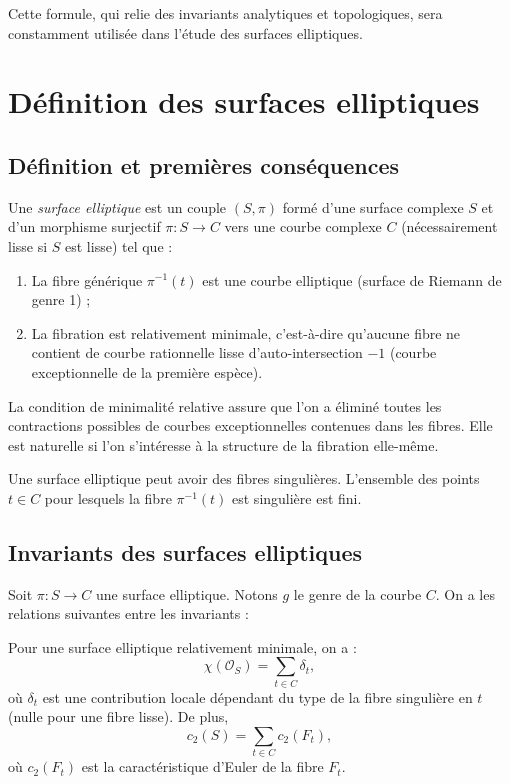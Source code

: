 Cette formule, qui relie des invariants analytiques et topologiques, sera constamment utilisée dans l'étude des surfaces elliptiques.

\section{Définition des surfaces elliptiques}

\subsection{Définition et premières conséquences}

\begin{definition}
Une \emph{surface elliptique} est un couple $(S, \pi)$ formé d'une surface complexe $S$ et d'un morphisme surjectif $\pi: S \to C$ vers une courbe complexe $C$ (nécessairement lisse si $S$ est lisse) tel que :
\begin{enumerate}
\item La fibre générique $\pi^{-1}(t)$ est une courbe elliptique (surface de Riemann de genre 1) ;
\item La fibration est relativement minimale, c'est-à-dire qu'aucune fibre ne contient de courbe rationnelle lisse d'auto-intersection $-1$ (courbe exceptionnelle de la première espèce).
\end{enumerate}
\end{definition}

La condition de minimalité relative assure que l'on a éliminé toutes les contractions possibles de courbes exceptionnelles contenues dans les fibres. Elle est naturelle si l'on s'intéresse à la structure de la fibration elle-même.

\begin{remarque}
Une surface elliptique peut avoir des fibres singulières. L'ensemble des points $t \in C$ pour lesquels la fibre $\pi^{-1}(t)$ est singulière est fini.
\end{remarque}

\subsection{Invariants des surfaces elliptiques}

Soit $\pi: S \to C$ une surface elliptique. Notons $g$ le genre de la courbe $C$. On a les relations suivantes entre les invariants :

\begin{theoreme}
Pour une surface elliptique relativement minimale, on a :
\[
\chi(\mathcal{O}_S) = \sum_{t \in C} \delta_t,
\]
où $\delta_t$ est une contribution locale dépendant du type de la fibre singulière en $t$ (nulle pour une fibre lisse). De plus,
\[
c_2(S) = \sum_{t \in C} c_2(F_t),
\]
où $c_2(F_t)$ est la caractéristique d'Euler de la fibre $F_t$.
\end{theoreme}

